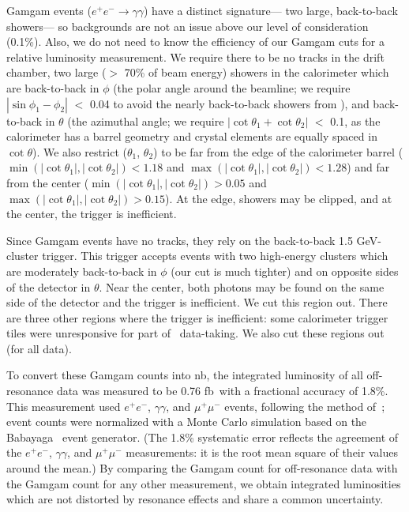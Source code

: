 \documentclass[aps,prd,preprint,superscriptaddress,tightenlines,nofootinbib,floatfix]{revtex4}
\begin{document}
Gamgam events ($e^+e^- \to \gamma\gamma$) have a distinct signature---
two large, back-to-back showers--- so backgrounds are not an issue
above our level of consideration (0.1\%).  Also, we do not need to
know the efficiency of our Gamgam cuts for a relative luminosity
measurement.  We require there to be no tracks in the drift chamber,
two large ($>$ 70\% of beam energy) showers in the calorimeter which
are back-to-back in $\phi$ (the polar angle around the beamline; we
require $|\sin \phi_1 - \phi_2|$ $<$ 0.04 to avoid the nearly
back-to-back showers from \ee), and back-to-back in $\theta$ (the
azimuthal angle; we require $|\cot\theta_1 + \cot\theta_2|$ $<$ 0.1,
as the calorimeter has a barrel geometry and crystal elements are
equally spaced in $\cot\theta$).  We also restrict ($\theta_1$,
$\theta_2$) to be far from the edge of the calorimeter barrel
($\min(|\cot\theta_1|, |\cot\theta_2|) < 1.18$ and
$\max(|\cot\theta_1|, |\cot\theta_2|) < 1.28$) and far from the center
($\min(|\cot\theta_1|, |\cot\theta_2|) > 0.05$ and
$\max(|\cot\theta_1|, |\cot\theta_2|) > 0.15$).  At the edge, showers
may be clipped, and at the center, the trigger is inefficient.

Since Gamgam events have no tracks, they rely on the back-to-back 1.5
GeV-cluster trigger.  This trigger accepts events with two high-energy
clusters which are moderately back-to-back in $\phi$ (our cut is much
tighter) and on opposite sides of the detector in $\theta$.  Near the
center, both photons may be found on the same side of the detector and
the trigger is inefficient.  We cut this region out.  There are three
other regions where the trigger is inefficient: some calorimeter
trigger tiles were unresponsive for part of \ups\ data-taking.  We
also cut these regions out (for all data).

To \label{pag:lumical} convert these Gamgam counts into nb\inv, the
integrated luminosity of all off-resonance data was measured to be
0.76 fb\inv\ with a fractional accuracy of 1.8\%.  This measurement
used $e^+e^-$, $\gamma\gamma$, and $\mu^+\mu^-$ events, following the
method of~\cite{LUMINS}; event counts were normalized with a Monte
Carlo simulation based on the Babayaga~\cite{babayaga} event
generator.  (The 1.8\% systematic error reflects the agreement of the
$e^+e^-$, $\gamma\gamma$, and $\mu^+\mu^-$ measurements: it is the
root mean square of their values around the mean.)  By comparing the
Gamgam count for off-resonance data with the Gamgam count for any
other measurement, we obtain integrated luminosities which are not
distorted by resonance effects and share a common uncertainty.
\end{document}
